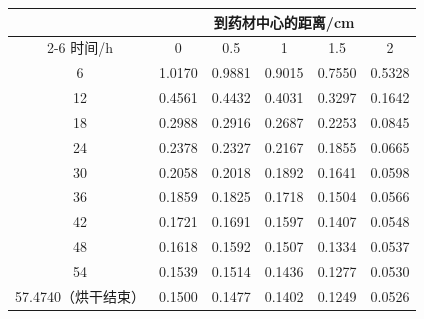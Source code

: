 \begin{tabular}{cccccc}
\toprule
 & \multicolumn{5}{c}{到药材中心的距离/cm} \\
\cmidrule(lr){2-6}
时间/h & 0 & 0.5 & 1 & 1.5 & 2 \\
\midrule
6 & 1.0170 & 0.9881 & 0.9015 & 0.7550 & 0.5328 \\
12 & 0.4561 & 0.4432 & 0.4031 & 0.3297 & 0.1642 \\
18 & 0.2988 & 0.2916 & 0.2687 & 0.2253 & 0.0845 \\
24 & 0.2378 & 0.2327 & 0.2167 & 0.1855 & 0.0665 \\
30 & 0.2058 & 0.2018 & 0.1892 & 0.1641 & 0.0598 \\
36 & 0.1859 & 0.1825 & 0.1718 & 0.1504 & 0.0566 \\
42 & 0.1721 & 0.1691 & 0.1597 & 0.1407 & 0.0548 \\
48 & 0.1618 & 0.1592 & 0.1507 & 0.1334 & 0.0537 \\
54 & 0.1539 & 0.1514 & 0.1436 & 0.1277 & 0.0530 \\
57.4740（烘干结束） & 0.1500 & 0.1477 & 0.1402 & 0.1249 & 0.0526 \\
\bottomrule
\end{tabular}
